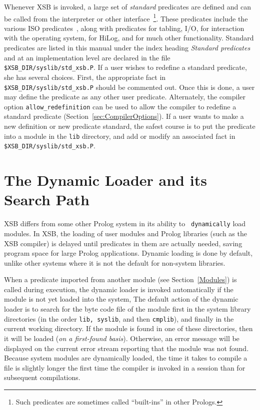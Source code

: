 Whenever XSB is invoked, a large set of {\em standard} predicates are
defined and can be called from the interpreter or other
interface~\footnote{Such predicates are sometimes called ``built-ins''
  in other Prologs.}.  These predicates include the various ISO
predicates~\cite{ISO-Prolog}, along with predicates for tabling, I/O,
for interaction with the operating system, for HiLog, and for much
other functionality.  Standard predicates are listed in this manual
under the index heading {\em Standard predicates} and at an
implementation level are declared in the file {\tt
  \$XSB\_DIR/syslib/std\_xsb.P}.  If a user wishes to redefine a
standard predicate, she has several choices.  First, the appropriate
fact in {\tt \$XSB\_DIR/syslib/std\_xsb.P} should be commented out.
Once this is done, a user may define the predicate as any other user
predicate.  Alternately, the compiler option {\tt allow\_redefinition}
can be used to allow the compiler to redefine a standard predicate
(Section~\ref{sec:CompilerOptions}).  If a user wants to make a new
definition or new predicate standard, the safest course is to put the
predicate into a module in the {\tt lib} directory, and add or modify
an associated fact in {\tt \$XSB\_DIR/syslib/std\_xsb.P}.

\section{The Dynamic Loader and its Search Path} \label{LibPath}

XSB differs from some other Prolog system in its ability to {\tt
  dynamically} load modules.  In XSB, the loading of user modules and
Prolog libraries (such as the XSB compiler) is delayed until
predicates in them are actually needed, saving program space for large
Prolog applications.  Dynamic loading is done by default, unlike other
systems where it is not the default for non-system libraries.

When a predicate imported from another module (see
Section~\ref{Modules}) is called during execution, the dynamic loader
is invoked automatically if the module is not yet loaded into the
system, The default action of the dynamic loader is to search for the
byte code file of the module first in the system library directories
(in the order {\tt lib, syslib}, and then {\tt cmplib}), and finally
in the current working directory.  If the module is found in one of
these directories, then it will be loaded ({\em on a first-found
basis}). Otherwise, an error message will be displayed on the current
error stream reporting that the module was not found.  Because system
modules are dynamically loaded, the time it takes to compile a file is
slightly longer the first time the compiler is invoked in a session
than for subsequent compilations.


